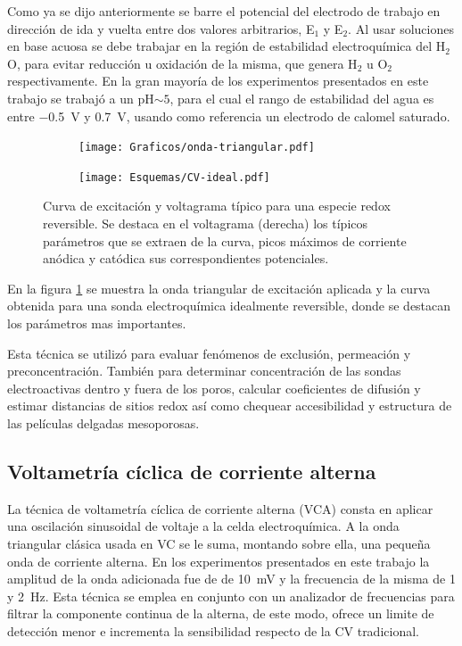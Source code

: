 	 		Como ya se dijo anteriormente se barre el potencial del electrodo de trabajo en dirección de ida y vuelta entre dos valores arbitrarios, E$_1$ y E$_2$. Al usar soluciones en base acuosa se debe trabajar en la región de estabilidad electroquímica del H$_2$O, para evitar reducción u oxidación de la misma, que genera H$_2$ u O$_2$ respectivamente. En la gran mayoría de los experimentos presentados en este trabajo se trabajó a un pH$\sim 5$, para el cual el rango de estabilidad del agua es entre \SI{-0.5}{\volt} y \SI{0.7}{\volt}, usando como referencia un electrodo de calomel saturado.\cite{wang2014} 


	 			 \begin{figure}[h!]
			  		  \begin{subfigure}[t]{0.495\textwidth}
			  		  \texttt{[image: Graficos/onda-triangular.pdf]}
			  		  \end{subfigure}
			  		  \begin{subfigure}[t]{0.495\textwidth}
			  		  \texttt{[image: Esquemas/CV-ideal.pdf]}
			  		  \end{subfigure}
			  		  \caption[Voltamperometría ideal reversible]{Curva de excitación y voltagrama típico para una especie redox reversible. Se destaca en el voltagrama (derecha) los típicos parámetros que se extraen de la curva, picos máximos de corriente anódica y catódica 
			  		  sus correspondientes potenciales.}
			  		  \label{fig:CV_ideal}
			  		  \end{figure}

			\vspace*{0.2cm}		  
	 		En la figura \ref{fig:CV_ideal} se muestra la onda triangular de excitación aplicada y la curva obtenida para una sonda electroquímica idealmente reversible, donde se destacan los parámetros mas importantes.
	 		
	 		Esta técnica se utilizó para evaluar fenómenos de exclusión, permeación y preconcentración. También para determinar concentración de las sondas electroactivas dentro y fuera de los poros, calcular coeficientes de difusión y estimar distancias de sitios redox así como chequear accesibilidad y estructura de las películas delgadas mesoporosas.

	 \subsection{Voltametría cíclica de corriente alterna}

	 		La técnica de voltametría cíclica de corriente alterna (VCA) consta en aplicar una oscilación sinusoidal de voltaje a la celda electroquímica. A la onda triangular clásica usada en VC se le suma, montando sobre ella, una pequeña onda de corriente alterna. En los experimentos presentados en este trabajo la amplitud de la onda adicionada fue de de \SI{10}{\milli\volt} y la frecuencia de la misma de 1 y \SI{2}{\hertz}. Esta técnica se emplea en conjunto con un analizador de frecuencias para filtrar la componente continua de la alterna, de este modo, ofrece un limite de detección menor e incrementa la sensibilidad respecto de la CV tradicional.\cite{Wi2000,Skoog1995}

